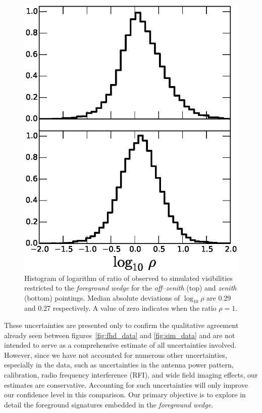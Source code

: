 \documentclass[preprint2,iop,numberedappendix]{emulateapj}
\begin{document}
\begin{figure}[htb]
\centering
\includegraphics[width=\linewidth]{figures/v1_0/delta_array_histogram_wedge_sim_data_log_ratio_0.3m_ground_custom_gaussian_FG_model_asm_all_sky_nside_64_Tsys_90.0K_185.0_MHz_30.7_MHz_bnw2.0.eps}
\caption{Histogram of logarithm of ratio of observed to simulated visibilities restricted to the {\it foreground wedge} for the {\it off--zenith} (top) and {\it zenith} (bottom) pointings. Median absolute deviations of $\log_{10}\rho$ are 0.29 and 0.27 respectively. A value of zero indicates when the ratio $\rho=1$. \label{fig:data-sim-ratio}}
\end{figure}

These uncertainties are presented only to confirm the qualitative agreement already seen between figures~\ref{fig:fhd_data} and \ref{fig:sim_data} and are not intended to serve as a comprehensive estimate of all uncertainties involved. However, since we have not accounted for numerous other uncertainties, especially in the data, such as uncertainties in the antenna power pattern, calibration, radio frequency interference (RFI), and wide field imaging effects, our estimates are conservative. Accounting for such uncertainties will only improve our confidence level in this comparison. Our primary objective is to explore in detail the foreground signatures embedded in the {\it foreground wedge}.
\end{document}
